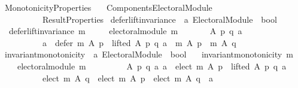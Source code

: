 %
\begin{isabellebody}%
%
%
\isadelimtheory
%
\endisadelimtheory
%
\isatagtheory
{}\isamarkupfalse%
\ Monotonicity{\isacharunderscore}{\kern0pt}Properties\isanewline
\ \ \ {\isachardoublequoteopen}{\isachardot}{\kern0pt}{\isachardot}{\kern0pt}{\isacharslash}{\kern0pt}Components{\isacharslash}{\kern0pt}Electoral{\isacharunderscore}{\kern0pt}Module{\isachardoublequoteclose}\isanewline
\ \ \ \ \ \ \ \ \ \ Result{\isacharunderscore}{\kern0pt}Properties\isanewline
\isanewline
{}%
\endisatagtheory
{\isafoldtheory}%
%
\isadelimtheory
\isanewline
%
\endisadelimtheory
\isanewline
\isanewline
{}\isamarkupfalse%
\ defer{\isacharunderscore}{\kern0pt}lift{\isacharunderscore}{\kern0pt}invariance\ {\isacharcolon}{\kern0pt}{\isacharcolon}{\kern0pt}\ {\isachardoublequoteopen}{\isacharprime}{\kern0pt}a\ Electoral{\isacharunderscore}{\kern0pt}Module\ {\isasymRightarrow}\ bool{\isachardoublequoteclose}\ \isanewline
\ \ {\isachardoublequoteopen}defer{\isacharunderscore}{\kern0pt}lift{\isacharunderscore}{\kern0pt}invariance\ m\ {\isasymequiv}\isanewline
\ \ \ \ electoral{\isacharunderscore}{\kern0pt}module\ m\ {\isasymand}\isanewline
\ \ \ \ \ \ {\isacharparenleft}{\kern0pt}{\isasymforall}A\ p\ q\ a{\isachardot}{\kern0pt}\isanewline
\ \ \ \ \ \ \ \ \ \ {\isacharparenleft}{\kern0pt}a\ {\isasymin}\ {\isacharparenleft}{\kern0pt}defer\ m\ A\ p{\isacharparenright}{\kern0pt}\ {\isasymand}\ lifted\ A\ p\ q\ a{\isacharparenright}{\kern0pt}\ {\isasymlongrightarrow}\ m\ A\ p\ {\isacharequal}{\kern0pt}\ m\ A\ q{\isacharparenright}{\kern0pt}{\isachardoublequoteclose}\isanewline
\isanewline
\isanewline
{}\isamarkupfalse%
\ invariant{\isacharunderscore}{\kern0pt}monotonicity\ {\isacharcolon}{\kern0pt}{\isacharcolon}{\kern0pt}\ {\isachardoublequoteopen}{\isacharprime}{\kern0pt}a\ Electoral{\isacharunderscore}{\kern0pt}Module\ {\isasymRightarrow}\ bool{\isachardoublequoteclose}\ \isanewline
\ \ {\isachardoublequoteopen}invariant{\isacharunderscore}{\kern0pt}monotonicity\ m\ {\isasymequiv}\isanewline
\ \ \ \ electoral{\isacharunderscore}{\kern0pt}module\ m\ {\isasymand}\isanewline
\ \ \ \ \ \ \ \ {\isacharparenleft}{\kern0pt}{\isasymforall}A\ p\ q\ a{\isachardot}{\kern0pt}\ {\isacharparenleft}{\kern0pt}a\ {\isasymin}\ elect\ m\ A\ p\ {\isasymand}\ lifted\ A\ p\ q\ a{\isacharparenright}{\kern0pt}\ {\isasymlongrightarrow}\isanewline
\ \ \ \ \ \ \ \ \ \ {\isacharparenleft}{\kern0pt}elect\ m\ A\ q\ {\isacharequal}{\kern0pt}\ elect\ m\ A\ p\ {\isasymor}\ elect\ m\ A\ q\ {\isacharequal}{\kern0pt}\ {\isacharbraceleft}{\kern0pt}a{\isacharbraceright}{\kern0pt}{\isacharparenright}{\kern0pt}{\isacharparenright}{\kern0pt}{\isachardoublequoteclose}\isanewline

\end{isabellebody}
